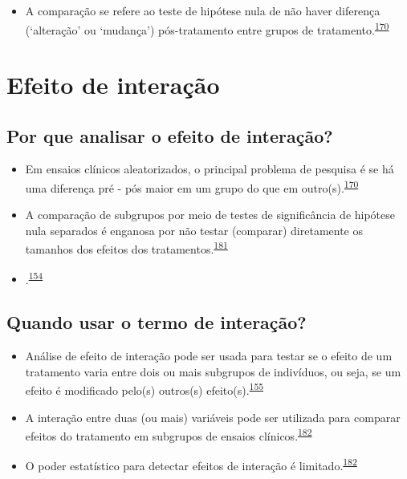 \documentclass[
  a4paper,
]{book}
\providecommand{\tightlist}{%
  \setlength{\itemsep}{0pt}\setlength{\parskip}{0pt}}
\begin{document}
\begin{itemize}
\tightlist
\item
  A comparação se refere ao teste de hipótese nula de não haver diferença (`alteração' ou `mudança') pós-tratamento entre grupos de tratamento.\textsuperscript{\protect\hyperlink{ref-bland2011}{170}}
\end{itemize}

\hypertarget{interacao}{%
\section{Efeito de interação}\label{interacao}}

\hypertarget{por-que-analisar-o-efeito-de-interauxe7uxe3o}{%
\subsection{Por que analisar o efeito de interação?}\label{por-que-analisar-o-efeito-de-interauxe7uxe3o}}

\begin{itemize}
\item
  Em ensaios clínicos aleatorizados, o principal problema de pesquisa é se há uma diferença pré - pós maior em um grupo do que em outro(s).\textsuperscript{\protect\hyperlink{ref-bland2011}{170}}
\item
  A comparação de subgrupos por meio de testes de significância de hipótese nula separados é enganosa por não testar (comparar) diretamente os tamanhos dos efeitos dos tratamentos.\textsuperscript{\protect\hyperlink{ref-Matthews1996}{181}}
\item
  .\textsuperscript{\protect\hyperlink{ref-Bours2023}{154}}
\end{itemize}

\hypertarget{quando-usar-o-termo-de-interauxe7uxe3o}{%
\subsection{Quando usar o termo de interação?}\label{quando-usar-o-termo-de-interauxe7uxe3o}}

\begin{itemize}
\item
  Análise de efeito de interação pode ser usada para testar se o efeito de um tratamento varia entre dois ou mais subgrupos de indivíduos, ou seja, se um efeito é modificado pelo(s) outros(s) efeito(s).\textsuperscript{\protect\hyperlink{ref-Altman1996}{155}}
\item
  A interação entre duas (ou mais) variáveis pode ser utilizada para comparar efeitos do tratamento em subgrupos de ensaios clínicos.\textsuperscript{\protect\hyperlink{ref-Altman2003}{182}}
\item
  O poder estatístico para detectar efeitos de interação é limitado.\textsuperscript{\protect\hyperlink{ref-Altman2003}{182}}
\end{itemize}
\end{document}
